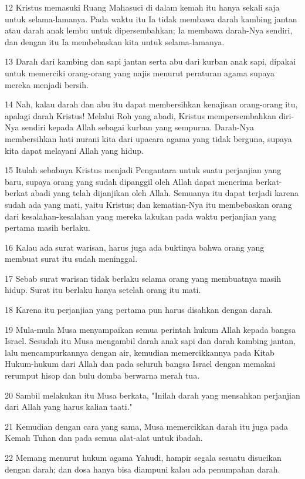 \par 12 Kristus memasuki Ruang Mahasuci di dalam kemah itu hanya sekali saja untuk selama-lamanya. Pada waktu itu Ia tidak membawa darah kambing jantan atau darah anak lembu untuk dipersembahkan; Ia membawa darah-Nya sendiri, dan dengan itu Ia membebaskan kita untuk selama-lamanya.
\par 13 Darah dari kambing dan sapi jantan serta abu dari kurban anak sapi, dipakai untuk memerciki orang-orang yang najis menurut peraturan agama supaya mereka menjadi bersih.
\par 14 Nah, kalau darah dan abu itu dapat membersihkan kenajisan orang-orang itu, apalagi darah Kristus! Melalui Roh yang abadi, Kristus mempersembahkan diri-Nya sendiri kepada Allah sebagai kurban yang sempurna. Darah-Nya membersihkan hati nurani kita dari upacara agama yang tidak berguna, supaya kita dapat melayani Allah yang hidup.
\par 15 Itulah sebabnya Kristus menjadi Pengantara untuk suatu perjanjian yang baru, supaya orang yang sudah dipanggil oleh Allah dapat menerima berkat-berkat abadi yang telah dijanjikan oleh Allah. Semuanya itu dapat terjadi karena sudah ada yang mati, yaitu Kristus; dan kematian-Nya itu membebaskan orang dari kesalahan-kesalahan yang mereka lakukan pada waktu perjanjian yang pertama masih berlaku.
\par 16 Kalau ada surat warisan, harus juga ada buktinya bahwa orang yang membuat surat itu sudah meninggal.
\par 17 Sebab surat warisan tidak berlaku selama orang yang membuatnya masih hidup. Surat itu berlaku hanya setelah orang itu mati.
\par 18 Karena itu perjanjian yang pertama pun harus disahkan dengan darah.
\par 19 Mula-mula Musa menyampaikan semua perintah hukum Allah kepada bangsa Israel. Sesudah itu Musa mengambil darah anak sapi dan darah kambing jantan, lalu mencampurkannya dengan air, kemudian memercikkannya pada Kitab Hukum-hukum dari Allah dan pada seluruh bangsa Israel dengan memakai rerumput hisop dan bulu domba berwarna merah tua.
\par 20 Sambil melakukan itu Musa berkata, "Inilah darah yang mensahkan perjanjian dari Allah yang harus kalian taati."
\par 21 Kemudian dengan cara yang sama, Musa memercikkan darah itu juga pada Kemah Tuhan dan pada semua alat-alat untuk ibadah.
\par 22 Memang menurut hukum agama Yahudi, hampir segala sesuatu disucikan dengan darah; dan dosa hanya bisa diampuni kalau ada penumpahan darah.
